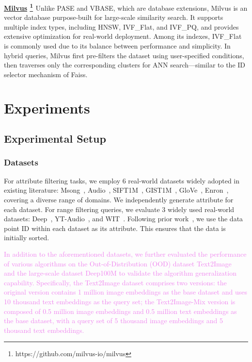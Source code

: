 \documentclass[sigconf, nonacm]{acmart}
\begin{document}
	\noindent\textbf{\underline{Milvus} \footnote{https://github.com/milvus-io/milvus} \cite{milvus}}
	Unlike PASE and VBASE, which are database extensions, Milvus is an vector database purpose-built for large-scale similarity search. It supports multiple index types, including HNSW, IVF\_Flat, and IVF\_PQ, and provides extensive optimization for real-world deployment. Among its indexes, IVF\_Flat is commonly used due to its balance between performance and simplicity. In hybrid queries, Milvus first pre-filters the dataset using user-specified conditions, then traverses only the corresponding clusters for ANN search—similar to the ID selector mechanism of Faiss.
	
	\section{Experiments}
	\subsection{Experimental Setup}
	\subsubsection{Datasets}
	
	For attribute filtering tasks, we employ 6 real-world datasets widely adopted in existing literature: Msong~\cite{msong2011}, Audio~\cite{audio_unknown}, SIFT1M~\cite{sift2010}, GIST1M~\cite{sift2010}, GloVe~\cite{GloVe2015}, Enron~\cite{enron2015}, covering a diverse range of domains. We independently generate attribute for each dataset.
	For range filtering queries, we evaluate 3 widely used real-world datasets: Deep~\cite{yandex_deep_dataset}, YT-Audio~\cite{youtube8m_dataset}, and WIT~\cite{wit_dataset}. Following prior work~\cite{DSG}, we use the data point ID within each dataset as its attribute. This ensures that the data is initially sorted.
	
	\textcolor{violet}{In addition to the aforementioned datasets, we further evaluated the performance of various algorithms on the Out-of-Distribution (OOD) dataset Text2Image~\cite{texttoimage} and the large-scale dataset Deep100M to validate the algorithm generalization capability. Specifically, the Text2Image dataset comprises two versions: the original version contains 1 million image embeddings as the base dataset and uses 10 thousand text embeddings as the query set; the Text2Image-Mix version is composed of 0.5 million image embeddings and 0.5 million text embeddings as the base dataset, with a query set of 5 thousand image embeddings and 5 thousand text embeddings.}
	
\end{document}
